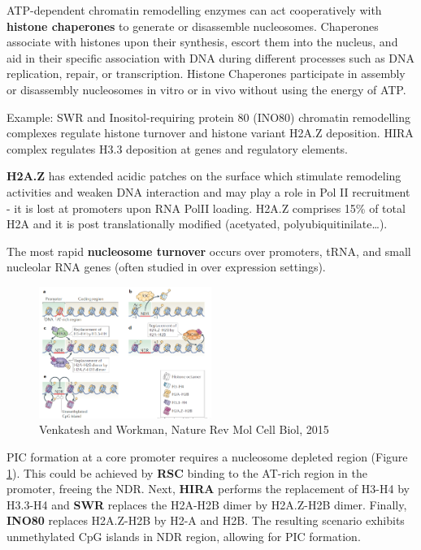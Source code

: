ATP-dependent chromatin remodelling enzymes can act cooperatively with \textbf{histone chaperones} to generate or disassemble nucleosomes. Chaperones associate with histones upon their synthesis, escort them into the nucleus, and aid in their specific association with DNA during different processes such as DNA replication, repair, or transcription. Histone Chaperones participate in assembly or disassembly nucleosomes in vitro or in vivo without using the energy of ATP.

Example: SWR and Inositol-requiring protein 80 (INO80) chromatin remodelling complexes regulate histone turnover and histone variant H2A.Z deposition. HIRA complex regulates H3.3 deposition at genes and regulatory elements.

\textbf{H2A.Z} has extended acidic patches on the surface which stimulate remodeling activities and weaken DNA interaction and may play a role in Pol II recruitment - it is lost at promoters upon RNA PolII loading. H2A.Z comprises 15\% of total H2A and it is post translationally modified (acetyated, polyubiquitinilate\ldots).

The most rapid \textbf{nucleosome turnover} occurs over promoters, tRNA, and small nucleolar RNA genes (often studied in over expression settings).

\begin{figure}
\centering
\includegraphics[width=0.5\textwidth]{../_resources/Screenshot_2022-09-23_at_15-22-44.png}
\caption{Venkatesh and Workman, Nature Rev Mol Cell Biol, 2015}
\label{fig:pronucleo}
\end{figure}

PIC formation at a core promoter requires a nucleosome depleted region (Figure \ref{fig:pronucleo}). This could be achieved by \textbf{RSC} binding to the AT-rich region in the promoter, freeing the NDR. Next, \textbf{HIRA} performs the replacement of H3-H4 by H3.3-H4 and \textbf{SWR} replaces the H2A-H2B dimer by H2A.Z-H2B dimer. Finally, \textbf{INO80} replaces H2A.Z-H2B by H2-A and H2B. The resulting scenario exhibits unmethylated CpG islands in NDR region, allowing for PIC formation.

